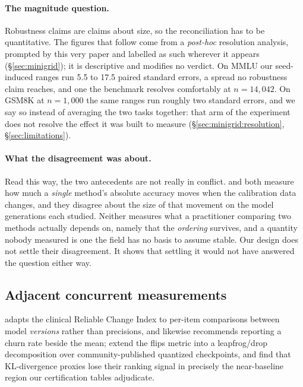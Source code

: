 \paragraph{The magnitude question.} Robustness claims are
claims about size, so the reconciliation has to be quantitative. The figures
that follow come from a \emph{post-hoc} resolution analysis, prompted by this
very paper and labelled as such wherever it appears (\S\ref{sec:minigrid}); it
is descriptive and modifies no verdict. On MMLU our seed-induced ranges run 5.5
to 17.5 paired standard errors, a spread no robustness claim reaches, and one
the benchmark resolves comfortably at $n = 14{,}042$.
On GSM8K at $n = 1{,}000$ the same ranges run roughly two standard errors, and
we say so instead of averaging the two tasks together: that arm of the
experiment does not resolve the effect it was built to measure
(\S\ref{sec:minigrid:resolution}, \S\ref{sec:limitations}).

\paragraph{What the disagreement was about.} Read this way, the two antecedents
are not really in conflict. \citet{williamsaletras2024} and
\citet{paglieri2024outliers} both measure how much a \emph{single} method's
absolute accuracy moves when the calibration data changes, and they disagree
about the size of that movement on the model generations each studied. Neither
measures what a practitioner comparing two methods actually depends on, namely that the
\emph{ordering} survives, and a quantity nobody measured is one the field has no
basis to assume stable. Our design does not settle their disagreement. It shows
that settling it would not have answered the question either way.

\subsection{Adjacent concurrent measurements}
\label{app:related:concurrent}

\citet{cacioli2026beyondmean} adapts the clinical Reliable Change Index to
per-item comparisons between model \emph{versions} rather than precisions, and
likewise recommends reporting a churn rate beside the mean;
\citet{nikolic2026displacement} extend the flips metric into a leapfrog/drop
decomposition over community-published quantized checkpoints, and find
that KL-divergence proxies lose their ranking signal in precisely the
near-baseline region our certification tables adjudicate.


